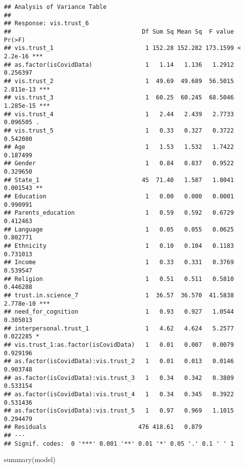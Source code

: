 \documentclass[
]{article}
\newenvironment{Shaded}{\begin{snugshade}}{\end{snugshade}}
\newcommand{\FunctionTok}[1]{\textcolor[rgb]{0.00,0.00,0.00}{#1}}
\newcommand{\NormalTok}[1]{#1}
\begin{document}
\begin{verbatim}
## Analysis of Variance Table
## 
## Response: vis.trust_6
##                                     Df Sum Sq Mean Sq  F value    Pr(>F)    
## vis.trust_1                          1 152.28 152.282 173.1599 < 2.2e-16 ***
## as.factor(isCovidData)               1   1.14   1.136   1.2912  0.256397    
## vis.trust_2                          1  49.69  49.689  56.5015 2.811e-13 ***
## vis.trust_3                          1  60.25  60.245  68.5046 1.285e-15 ***
## vis.trust_4                          1   2.44   2.439   2.7733  0.096505 .  
## vis.trust_5                          1   0.33   0.327   0.3722  0.542080    
## Age                                  1   1.53   1.532   1.7422  0.187499    
## Gender                               1   0.84   0.837   0.9522  0.329650    
## State_1                             45  71.40   1.587   1.8041  0.001543 ** 
## Education                            1   0.00   0.000   0.0001  0.990991    
## Parents_education                    1   0.59   0.592   0.6729  0.412463    
## Language                             1   0.05   0.055   0.0625  0.802771    
## Ethnicity                            1   0.10   0.104   0.1183  0.731013    
## Income                               1   0.33   0.331   0.3769  0.539547    
## Religion                             1   0.51   0.511   0.5810  0.446288    
## trust.in.science_7                   1  36.57  36.570  41.5838 2.778e-10 ***
## need_for_cognition                   1   0.93   0.927   1.0544  0.305013    
## interpersonal.trust_1                1   4.62   4.624   5.2577  0.022285 *  
## vis.trust_1:as.factor(isCovidData)   1   0.01   0.007   0.0079  0.929196    
## as.factor(isCovidData):vis.trust_2   1   0.01   0.013   0.0146  0.903748    
## as.factor(isCovidData):vis.trust_3   1   0.34   0.342   0.3889  0.533154    
## as.factor(isCovidData):vis.trust_4   1   0.34   0.345   0.3922  0.531436    
## as.factor(isCovidData):vis.trust_5   1   0.97   0.969   1.1015  0.294479    
## Residuals                          476 418.61   0.879                       
## ---
## Signif. codes:  0 '***' 0.001 '**' 0.01 '*' 0.05 '.' 0.1 ' ' 1
\end{verbatim}

\begin{Shaded}
\begin{Highlighting}[]
\FunctionTok{summary}\NormalTok{(model)}
\end{Highlighting}
\end{Shaded}
\end{document}
